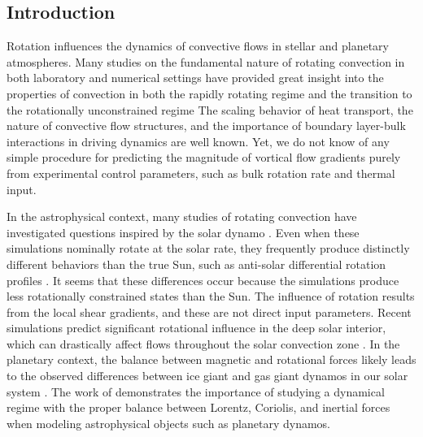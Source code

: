 \subsection{Introduction}
\label{sec:intro}
Rotation influences the dynamics of convective flows in
stellar and planetary atmospheres.
Many studies on the fundamental nature of
rotating convection in both laboratory and numerical settings
have provided great insight into the properties of convection 
in both the rapidly rotating regime 
and the transition to the rotationally unconstrained regime 
\cite{king&all2009, zhong&all2009, schmitz&tilgner2009, king&all2012, julien&all2012, king&all2013, ecke&niemela2014, stellmach&all2014, cheng&all2015, gastine&all2016}
The scaling behavior of heat transport, the nature of convective flow
structures, and the importance of boundary layer-bulk interactions in driving dynamics are well known.
Yet, we do not know of any simple procedure for predicting the magnitude of vortical flow gradients 
purely from experimental control parameters, such as bulk rotation rate and thermal input.

In the astrophysical context,
many studies of rotating convection have investigated questions inspired by the solar dynamo
\cite{glatzmaier&gilman1982, busse2002, brown&all2008,
brown&all2010, brown&all2011, augustson&all2012, guerrero&all2013, kapyla&all2014}.
Even when these simulations nominally rotate at the solar rate,
they frequently produce distinctly different behaviors than the true Sun,
such as anti-solar differential rotation profiles  \cite{gastine&all2014, brun&all2017}.
It seems that these differences occur because the simulations produce less rotationally 
constrained states than the Sun. 
The influence of rotation results from the local 
shear gradients, and these are not direct input parameters.
Recent simulations predict significant rotational influence in the deep solar interior, 
which can drastically affect flows throughout the solar convection zone 
\cite{featherstone&hindman2016a, greer&all2016}. 
In the planetary context, the balance between magnetic
and rotational forces likely leads to the observed differences between ice
giant and gas giant dynamos in our solar system \cite{soderlund&all2015}.
The work of \cite{aurnou&king2017} demonstrates the importance of studying a dynamical regime
with the proper balance between Lorentz, Coriolis, and inertial forces when modeling
astrophysical objects such as planetary dynamos.

